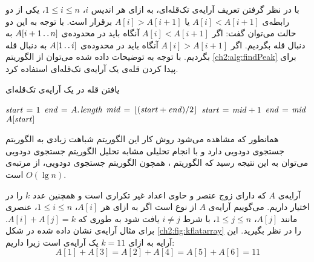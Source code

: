 با در نظر گرفتن تعریف آرایه‌ی تک‌قله‌ای، به ازای هر اندیس {$i$}، {$1 \leqslant i \leqslant n$}، یکی از دو رابطه‌ی {$A[i] < A[i+1]$} یا {$A[i]>A[i+1]$} برقرار است. با توجه به این دو حالت می‌توان گفت:
 اگر {$A[i]<A[i+1]$} آنگاه باید در محدوده‌ی {$A[i+1\mathinner{\ldotp\ldotp} n]$} به دنبال قله بگردیم.
 اگر {$A[i]>A[i+1]$} آنگاه باید در محدوده‌ی {$A[1\mathinner{\ldotp\ldotp} i]$} به دنبال قله بگردیم.
با توجه به توضیحات داده شده می‌توان از الگوریتم {\ref{ch2:alg:findPeak}} برای پیدا کردن قله‌ی یک آرایه‌ی تک‌قله‌ای استفاده کرد.
\begin{algorithm}
\caption{یافتن قله در یک آرایه‌ی تک‌قله‌ای}\label{ch2:alg:findPeak}
\begin{latin}
\begin{algorithmic}[1]
		\State	$\mathit{start} \mathrel{\hspace{1pt}=\hspace{1pt}} 1$
		\State	$\mathit{end} \mathrel{\hspace{1pt}=\hspace{1pt}} A.\hspace*{1pt}\mathit{length}$
				\State	$\mathit{mid} \mathrel{\hspace{1pt}=\hspace{1pt}} \lfloor(\mathit{start}+\mathit{end}) / 2\rfloor$
						\State	$\mathit{start} \mathrel{\hspace{1pt}=\hspace{1pt}} \mathit{mid}+1$
				\EndIf
						\State	$\mathit{end} \mathrel{\hspace{1pt}=\hspace{1pt}} \mathit{mid}$
				\EndIf
		\EndWhile
		\State	\Return $A[\mathit{start}]$	
\EndFunction
\end{algorithmic}
\end{latin}
\end{algorithm}

همانطور که مشاهده می‌شود روش کار این الگوریتم شباهت زیادی به الگوریتم جستجوی دودویی دارد و با انجام تحلیلی مشابه تحلیل الگوریتم جستجوی دودویی می‌توان به این نتیجه رسید که الگوریتم {}، همچون الگوریتم جستجوی دودویی، از مرتبه‌ی {$O(\lg n)$} است.

 آرایه‌ی {$A$} که دارای زوج عنصر و حاوی اعداد غیر تکراری است  و همچنین عدد {$k$} را در اختیار داریم. می‌گوییم آرایه‌ی {$A$} از نوع
 {} است اگر به ازای هر {$A[i]$}، {$1\leqslant i\leqslant n$}، عنصری مانند {$A[j]$}، {$1\leqslant j\leqslant n$}، با شرط
 {$i \neq j$} یافت شود به طوری که {$A[i]+A[j]=k$}. برای مثال آرایه‌ی نشان داده شده در شکل {\eqref{ch2:fig:kflatarray}} را در نظر بگیرید. این آرایه به ازای {$k=11$} یک آرایه‌ی {} است زیرا داریم:
\begin{displaymath}
A[1]+A[3]=A[2]+A[4]=A[5]+A[6]=11
\end{displaymath}

